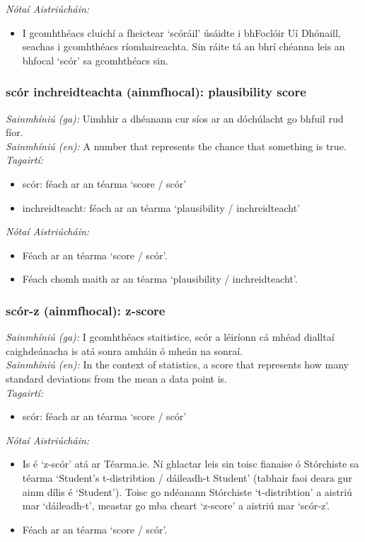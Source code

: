 \documentclass{article}
\begin{document}
 \noindent \textit{Nótaí Aistriúcháin:}
\begin{itemize}
	\item I gcomhthéacs cluichí a fheictear `scóráil' úsáidte i bhFoclóir Uí Dhónaill, seachas i gcomhthéacs ríomhaireachta. Sin ráite tá an bhrí chéanna leis an bhfocal `scór' sa gcomhthéacs sin.
\end{itemize}


\subsubsection*{scór inchreidteachta (ainmfhocal): plausibility score}
 \noindent \textit{Sainmhíniú (ga):} Uimhhir a dhéanann cur síos ar an dóchúlacht go bhfuil rud fíor.
\\
 \noindent \textit{Sainmhíniú (en):} A number that represents the chance that something is true.
\\
 \noindent \textit{Tagairtí:}
\begin{itemize}
	\item scór: féach ar an téarma `score / scór'
	\item inchreidteacht: féach ar an téarma `plausibility / inchreidteacht'
\end{itemize}

 \noindent \textit{Nótaí Aistriúcháin:}
\begin{itemize}
	\item Féach ar an téarma `score / scór'.
	\item Féach chomh maith ar an téarma `plausibility / inchreidteacht'.
\end{itemize}


\subsubsection*{scór-z (ainmfhocal): z-score}
 \noindent \textit{Sainmhíniú (ga):} I gcomhthéacs staitistice, scór a léiríonn cá mhéad dialltaí caighdeánacha is atá sonra amháin ó mheán na sonraí.
\\
 \noindent \textit{Sainmhíniú (en):} In the context of statistics, a score that represents how many standard deviations from the mean a data point is.
\\
 \noindent \textit{Tagairtí:}
\begin{itemize}
	\item scór: féach ar an téarma `score / scór'
\end{itemize}

 \noindent \textit{Nótaí Aistriúcháin:}
\begin{itemize}
	\item Is é `z-scór' atá ar Téarma.ie. Ní ghlactar leis sin toisc fianaise ó Stórchiste sa téarma `Student's t-distribtion / dáileadh-t Student' (tabhair faoi deara gur ainm dílis é `Student'). Toisc go ndéanann Stórchiste `t-distribtion' a aistriú mar `dáileadh-t', meastar go mba cheart `z-score' a aistriú mar `scór-z'.
	\item Féach ar an téarma `score / scór'.
\end{itemize}
\end{document}
